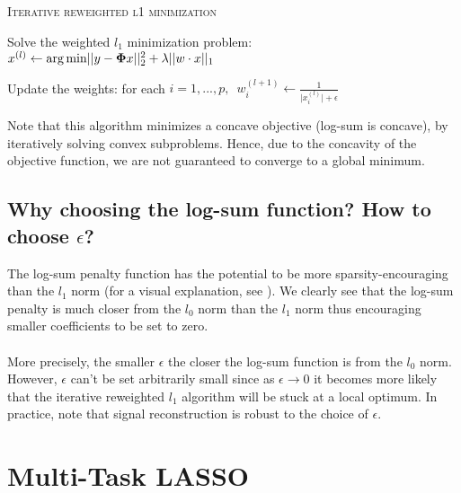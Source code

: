 \documentclass[a4paper,10pt]{article}
\theoremstyle{definition}
\begin{document}
{\fontsize{4}{4}\selectfont
\begin{algorithm}[h]  %
\caption{\textsc{Iterative reweighted l1 minimization}
}
%


    {
        Solve the weighted $l_1$ minimization problem: 
        $x^{(l)} \leftarrow \operatorname*{arg\,min} \lvert\lvert y -  \mathbf{\Phi} x\rvert\rvert_2^2 + \lambda \lvert\lvert w \cdot x\rvert\rvert_1$

        Update the weights: for each 
        $i = 1, ..., p, \enspace w_i^{(l+1)} \leftarrow \frac{1}{\lvert x_i^{(l)} \rvert + \epsilon}$
    }

\end{algorithm}
}

\vskip 0.2in

Note that this algorithm minimizes a concave objective (log-sum is concave), by iteratively solving convex subproblems. Hence, due to the concavity of the objective function, we
are not guaranteed to converge to a global minimum.

\subsection*{Why choosing the log-sum function? How to choose $\epsilon$?}

The log-sum penalty function has the potential to be more sparsity-encouraging than the $l_1$ norm (for a visual explanation, see \cite{Candes_Wakin_Boyd08}). We clearly see
that the log-sum penalty is much closer from the $l_0$ norm than the $l_1$ norm thus encouraging smaller coefficients to be set to zero.
\\
\\
More precisely, the smaller $\epsilon$ the closer the log-sum function is from the $l_0$ norm. However, $\epsilon$ can't be set arbitrarily small since as $\epsilon \rightarrow 0$ it
becomes more likely that the iterative reweighted $l_1$ algorithm will be stuck at a local optimum. In practice, note that signal reconstruction is robust to the choice of $\epsilon$.

\section{Multi-Task LASSO}
\label{section_4}
\end{document}

